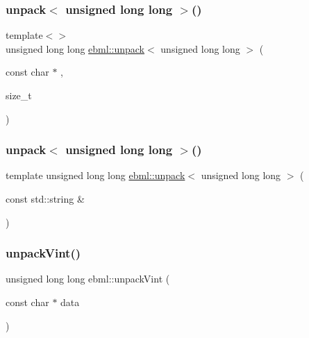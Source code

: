 \subsubsection{\texorpdfstring{unpack$<$ unsigned long long $>$()}{unpack< unsigned long long >()}\hspace{0.1cm}{\footnotesize\ttfamily [1/2]}}
{\footnotesize\ttfamily template$<$$>$ \\
unsigned long long \mbox{\hyperlink{namespaceebml_a55a0f9d0c93e80d488021fd03c4f3861}{ebml\+::unpack}}$<$ unsigned long long $>$ (\begin{DoxyParamCaption}\item[{const char $\ast$}]{,  }\item[{size\+\_\+t}]{ }\end{DoxyParamCaption})}

\mbox{\label{namespaceebml_a5ed4cbd5d003214f9e309b89ef17d630}} 
\subsubsection{\texorpdfstring{unpack$<$ unsigned long long $>$()}{unpack< unsigned long long >()}\hspace{0.1cm}{\footnotesize\ttfamily [2/2]}}
{\footnotesize\ttfamily template unsigned long long \mbox{\hyperlink{namespaceebml_a55a0f9d0c93e80d488021fd03c4f3861}{ebml\+::unpack}}$<$ unsigned long long $>$ (\begin{DoxyParamCaption}\item[{const std\+::string \&}]{ }\end{DoxyParamCaption})}

\mbox{\label{namespaceebml_a7928e2829b2feaf2516b0b019b28bf65}} 
\subsubsection{\texorpdfstring{unpack\+Vint()}{unpackVint()}\hspace{0.1cm}{\footnotesize\ttfamily [1/4]}}
{\footnotesize\ttfamily unsigned long long ebml\+::unpack\+Vint (\begin{DoxyParamCaption}\item[{const char $\ast$}]{data }\end{DoxyParamCaption})}


